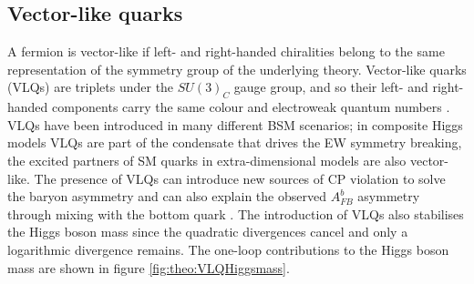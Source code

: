 \subsection{Vector-like quarks}
\label{sec:theo:vlq}

A fermion is vector-like if  left- and right-handed chiralities belong to the same representation of the symmetry group of the underlying theory.
Vector-like quarks (VLQs) are triplets under the $SU(3)_{C}$ gauge group, and so their left- and right-handed components carry the same colour and electroweak quantum numbers \cite{Aguilar-Saavedra:2013qpa,Okada:2012gy,Aguilar-Saavedra:2013wba,jaas}. VLQs have been introduced in many different BSM scenarios; in composite Higgs models VLQs are part of the condensate that drives the EW symmetry breaking, the excited partners of SM quarks in extra-dimensional models are also vector-like. The presence of VLQs can introduce new sources of CP violation to solve the baryon asymmetry \cite{delAguila:1997vn} and can also explain the observed $A^{b}_{FB}$ asymmetry through mixing with the bottom quark \cite{Choudhury:2001hs,Kumar:2010vx}. The introduction of VLQs also stabilises the Higgs boson mass since the quadratic divergences cancel and only a logarithmic divergence remains. The one-loop contributions to the Higgs boson mass are shown in figure \ref{fig:theo:VLQHiggsmass}. 

